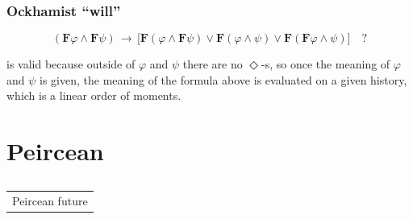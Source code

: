 \documentclass[xcolor=x11names]{beamer}
\makeatletter
\let\beamer@writeslidentry@miniframeson=\beamer@writeslidentry
\def\beamer@writeslidentry@miniframesoff{%
  \expandafter\beamer@ifempty\expandafter{\beamer@framestartpage}{}%
  {%
    \clearpage\beamer@notesactions%
  }
}
\newcommand*{\miniframeson}{\let\beamer@writeslidentry=\beamer@writeslidentry@miniframeson}
\newcommand*{\miniframesoff}{\let\beamer@writeslidentry=\beamer@writeslidentry@miniframesoff}
\newcommand{\cimdia}[1] {\miniframesoff \begin{frame}\begin{center}\huge \begin{tabular}{c}#1\end{tabular}\end{center}\end{frame}\miniframeson}
\newcommand{\szakasz}[2][]{\section{#1}\subsection{}\cimdia{#2}}
\newcommand{\FD}{\mathbf F}
\newcommand{\lthen}{\rightarrow}
\makeatother
\begin{document}

\begin{frame}
	\frametitle{\large Ockhamist ``will''}
\footnotesize

{\large
\[ (\FD \varphi \land \FD \psi)\, \lthen \, \big[ \FD(\varphi \land \FD \psi) \lor \FD(\varphi \land \psi) \lor \FD(\FD \varphi \land \psi)\big] \quad ? \]
}

is valid because outside of $\varphi$ and $\psi$ there are no $\Diamond$-s, so once the meaning of $\varphi$ and $\psi$ is given, the meaning of the formula above is evaluated on a given history, which is a linear order of moments.


\end{frame}


\szakasz[Peircean]{Peircean future}
\end{document}
